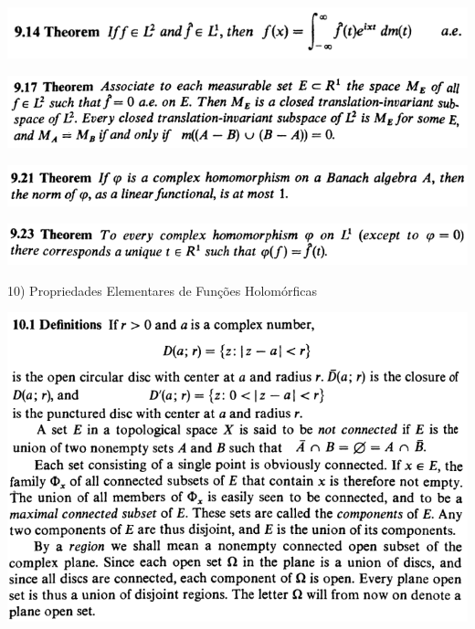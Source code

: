 \documentclass[12pt]{article}
\begin{document}
		\begin{center}
		\includegraphics{9ponto14}
		\end{center}

		\begin{center}
		\includegraphics{9ponto17}
		\end{center}

		\begin{center}
		\includegraphics{9ponto21}
		\end{center}

		\begin{center}
		\includegraphics{9ponto23}
		\end{center}

\vspace{3mm}

10) Propriedades Elementares de Fun\c{c}\~oes Holom\'orficas

\vspace{3mm}

		\begin{center}
		\includegraphics{d10ponto1}
		\end{center}
\end{document}
